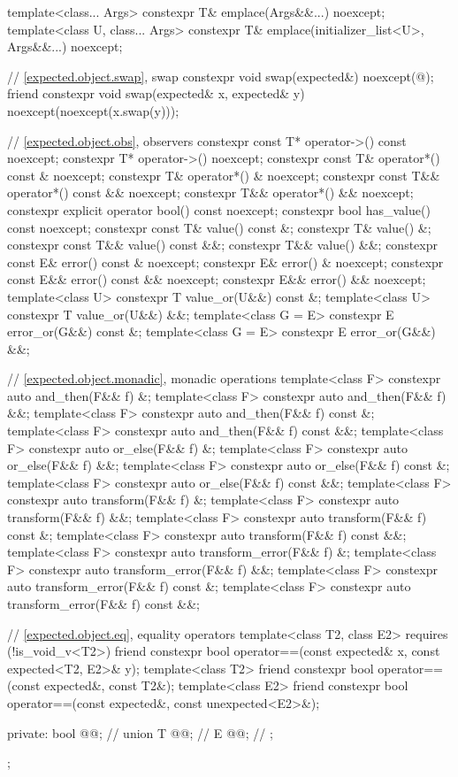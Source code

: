 \begin{codeblock}
{{    template<class... Args>
      constexpr T& emplace(Args&&...) noexcept;
    template<class U, class... Args>
      constexpr T& emplace(initializer_list<U>, Args&&...) noexcept;

    // \ref{expected.object.swap}, swap
    constexpr void swap(expected&) noexcept(@\seebelow@);
    friend constexpr void swap(expected& x, expected& y) noexcept(noexcept(x.swap(y)));

    // \ref{expected.object.obs}, observers
    constexpr const T* operator->() const noexcept;
    constexpr T* operator->() noexcept;
    constexpr const T& operator*() const & noexcept;
    constexpr T& operator*() & noexcept;
    constexpr const T&& operator*() const && noexcept;
    constexpr T&& operator*() && noexcept;
    constexpr explicit operator bool() const noexcept;
    constexpr bool has_value() const noexcept;
    constexpr const T& value() const &;
    constexpr T& value() &;
    constexpr const T&& value() const &&;
    constexpr T&& value() &&;
    constexpr const E& error() const & noexcept;
    constexpr E& error() & noexcept;
    constexpr const E&& error() const && noexcept;
    constexpr E&& error() && noexcept;
    template<class U> constexpr T value_or(U&&) const &;
    template<class U> constexpr T value_or(U&&) &&;
    template<class G = E> constexpr E error_or(G&&) const &;
    template<class G = E> constexpr E error_or(G&&) &&;

    // \ref{expected.object.monadic}, monadic operations
    template<class F> constexpr auto and_then(F&& f) &;
    template<class F> constexpr auto and_then(F&& f) &&;
    template<class F> constexpr auto and_then(F&& f) const &;
    template<class F> constexpr auto and_then(F&& f) const &&;
    template<class F> constexpr auto or_else(F&& f) &;
    template<class F> constexpr auto or_else(F&& f) &&;
    template<class F> constexpr auto or_else(F&& f) const &;
    template<class F> constexpr auto or_else(F&& f) const &&;
    template<class F> constexpr auto transform(F&& f) &;
    template<class F> constexpr auto transform(F&& f) &&;
    template<class F> constexpr auto transform(F&& f) const &;
    template<class F> constexpr auto transform(F&& f) const &&;
    template<class F> constexpr auto transform_error(F&& f) &;
    template<class F> constexpr auto transform_error(F&& f) &&;
    template<class F> constexpr auto transform_error(F&& f) const &;
    template<class F> constexpr auto transform_error(F&& f) const &&;

    // \ref{expected.object.eq}, equality operators
    template<class T2, class E2> requires (!is_void_v<T2>)
      friend constexpr bool operator==(const expected& x, const expected<T2, E2>& y);
    template<class T2>
      friend constexpr bool operator==(const expected&, const T2&);
    template<class E2>
      friend constexpr bool operator==(const expected&, const unexpected<E2>&);

  private:
    bool @@;       // \expos
    union {
      T @@;            // \expos
      E @@;           // \expos
    };
  };
}
\end{codeblock}

